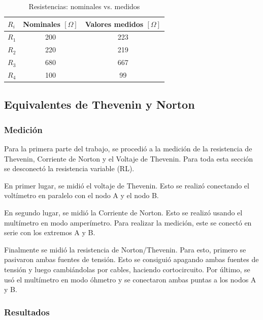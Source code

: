 \documentclass{article}
\begin{document}
        \begin{table}[H]
            \centering
            \begin{tabular}{|l|c|c|}
            \hline
            $R_i$ & \multicolumn{1}{l|}{Nominales $ [\Omega] $} & \multicolumn{1}{l|}{Valores medidos $ [\Omega] $}\\ \hline
            $R_1$ & 200         & 223         \\ \hline
            $R_2$ & 220         & 219         \\ \hline
            $R_3$ & 680         & 667         \\ \hline
            $R_4$ & 100         & 99          \\ \hline
            \end{tabular}
            \caption{Resistencias: nominales vs. medidos}
            \label{tab:resistencias}
        \end{table}

        \subsection{Equivalentes de Thevenin y Norton}
            \subsubsection{Medición}
                \quad Para la primera parte del trabajo, se procedió a la medición de la resistencia de Thevenin, Corriente de Norton y el Voltaje de Thevenin. Para toda esta sección se desconectó la resistencia variable (RL).\par
                En primer lugar, se midió el voltaje de Thevenin. Esto se realizó conectando el voltímetro en paralelo con el nodo A y el nodo B.\par
                En segundo lugar, se midió la Corriente de Norton. Esto se realizó usando el multímetro en modo amperímetro. Para realizar la medición, este se conectó en serie con los extremos A y B. \par
                Finalmente se midió la resistencia de Norton/Thevenin. Para esto, primero se  pasivaron ambas fuentes de tensión. Esto se consiguió apagando ambas fuentes de tensión y luego cambiándolas por cables, haciendo cortocircuito. Por último, se usó el multímetro en modo óhmetro y se conectaron ambas puntas a los nodos A y B.\par

            \subsubsection{Resultados}
\end{document}
